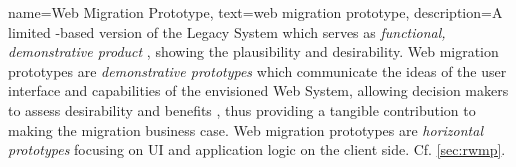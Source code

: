  {
  name=Web Migration Prototype,
  text=web migration prototype,
  description={A limited \web-based version of the \gls{Legacy System} which serves as \emph{functional, demonstrative product} \autocite{ISO/IEEE24765Vocabulary}, showing the plausibility and desirability. Web migration prototypes are \emph{demonstrative prototypes} which communicate the ideas of the user interface and capabilities of the envisioned \gls{Web System}, allowing decision makers to assess desirability and benefits \autocite{Wallmueller2001SoftwareQuality}, thus providing a tangible contribution to making the migration \gls{business case}. Web migration prototypes are \emph{horizontal prototypes} \autocite{Wallmueller2001SoftwareQuality} focusing on UI and application logic on the client side. Cf. \cref{sec:rwmp}.}
}